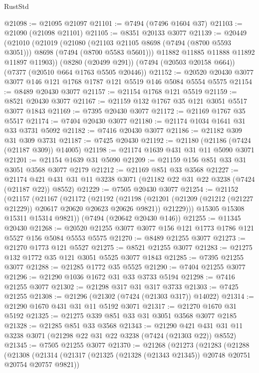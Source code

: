 \begin{lexlean}{RustStd}
\begin{coremodule}
@21098 := @21095 @21097
@21101 := @7494 (@7496 @1604 @37)
@21103 := @21090 (@21098 @21101)
@21105 := @8351 @20133 @3077
@21139 := @20449
    (@21010
      (@21019
        (@21080 (@21103 @21105 @8698 (@7494 (@8700 @5593 @3051))) @8698 (@7494 (@8700 @5583 @5601)))
        @11882
        @11885
        @11888
        @11892
        @11897
        @11903))
    (@8280 (@20499 @291))
    (@7494 (@20503 @20158 @664))
    (@7377 (@20510 @664 @1763 @5505 @20446))
@21152 := @20520 @20430 @3077 @3077 @146 @121 @1768 @1787 @121 @5519 @146 @5084 @5554 @5575
@21154 := @8489 @20430 @3077
@21157 := @21154 @1768 @121 @5519
@21159 := @8521 @20430 @3077
@21167 := @21159 @132 @1767 @35 @121 @3051 @5517 @3077 @1843
@21169 := @7395 @20430 @3077
@21172 := @21169 @1767 @35 @5517
@21174 := @7404 @20430 @3077
@21180 := @21174 @1034 @1641 @31 @33 @3731 @5092
@21182 := @7416 @20430 @3077
@21186 := @21182 @309 @31 @309 @3731
@21187 := @7425 @20430
@21192 := @21180 (@21186 (@7424 (@21187 @309)) @14005)
@21198 := @21174 @1639 @431 @31 @11 @5090 @3071
@21201 := @21154 @1639 @31 @5090
@21209 := @21159 @156 @851 @33 @31 @3051 @3568 @3077 @2179
@21212 := @21169 @851 @33 @3568
@21227 := @21174 @421 @431 @31 @11 @3238 @3071 (@21182 @22 @31 @22 @3238 (@7424 (@21187 @22)) @8552)
@21229 := @7505 @20430 @3077
@21254 := @21152
    (@21157
      (@21167
        (@21172
          (@21192
            (@21198
              (@21201 (@21209 (@21212 (@21227 @21229)) @20617 @20620 @20623 @20626 @9821))
              @21229)))
        @15305
        @15308
        @15311
        @15314
        @9821))
    (@7494 (@20642 @20430 @146))
@21255 := @11345 @20430
@21268 := @20520 @21255 @3077 @3077 @156 @121 @1773 @1786 @121 @5527 @156 @5084 @5553 @5575
@21270 := @8489 @21255 @3077
@21273 := @21270 @1773 @121 @5527
@21275 := @8521 @21255 @3077
@21283 := @21275 @132 @1772 @35 @121 @3051 @5525 @3077 @1843
@21285 := @7395 @21255 @3077
@21288 := @21285 @1772 @35 @5525
@21290 := @7404 @21255 @3077
@21296 := @21290 @1036 @1672 @31 @33 @3733 @5194
@21298 := @7416 @21255 @3077
@21302 := @21298 @317 @31 @317 @3733
@21303 := @7425 @21255
@21308 := @21296 (@21302 (@7424 (@21303 @317)) @14022)
@21314 := @21290 @1670 @431 @31 @11 @5192 @3071
@21317 := @21270 @1670 @31 @5192
@21325 := @21275 @339 @851 @33 @31 @3051 @3568 @3077 @2185
@21328 := @21285 @851 @33 @3568
@21343 := @21290 @421 @431 @31 @11 @3238 @3071 (@21298 @22 @31 @22 @3238 (@7424 (@21303 @22)) @8552)
@21345 := @7505 @21255 @3077
@21370 := @21268
    (@21273
      (@21283
        (@21288
          (@21308
            (@21314
              (@21317 (@21325 (@21328 (@21343 @21345)) @20748 @20751 @20754 @20757 @9821))

\end{coremodule}
\end{lexlean}
